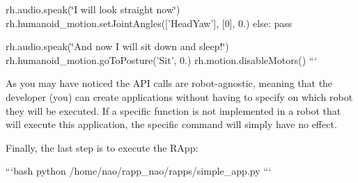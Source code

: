 rh.\-audio.\-speak(\char`\"{}\-I will look straight now\char`\"{}) rh.\-humanoid\-\_\-motion.\-set\-Joint\-Angles(\mbox{[}'Head\-Yaw'\mbox{]}, \mbox{[}0\mbox{]}, 0.) else\-: pass

rh.\-audio.\-speak(\char`\"{}\-And now I will sit down and sleep!\char`\"{}) rh.\-humanoid\-\_\-motion.\-go\-To\-Posture('Sit', 0.) rh.\-motion.\-disable\-Motors() ```

As you may have noticed the A\-P\-I calls are robot-\/agnostic, meaning that the developer (you) can create applications without having to specify on which robot they will be executed. If a specific function is not implemented in a robot that will execute this application, the specific command will simply have no effect.

Finally, the last step is to execute the R\-App\-:

```bash python /home/nao/rapp\-\_\-nao/rapps/simple\-\_\-app.py ``` 